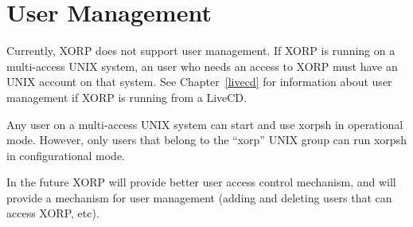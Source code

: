 %
%

\chapter{User Management}

Currently, XORP does not support user management. If XORP is running on a
multi-access UNIX system, an user who needs an access to XORP must have an
UNIX account on that system. See Chapter~\ref{livecd} for information about
user management if XORP is running from a LiveCD.

Any user on a multi-access UNIX system can start and use {\stt xorpsh}
in operational mode. However, only users that belong to the ``xorp''
UNIX group can run {\stt xorpsh} in configurational mode.

In the future XORP will provide better user access control mechanism,
and will provide a mechanism for user management (\eg adding and deleting
users that can access XORP, etc).








